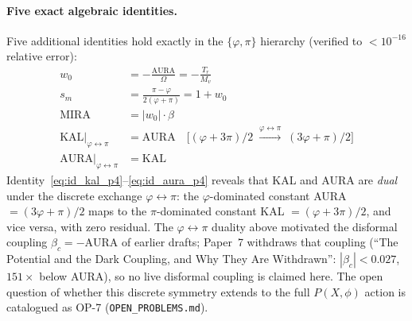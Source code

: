 \documentclass[12pt,a4paper]{article}
\begin{document}
\paragraph{Five exact algebraic identities.}
Five additional identities hold exactly in the $\{\varphi,\pi\}$ hierarchy
(verified to $<10^{-16}$ relative error):
\begin{align}
  w_0 &= -\frac{\mathrm{AURA}}{\Omega}
       = -\frac{T_r}{M_v} \label{eq:id_w0_p4} \\
  s_m &= \frac{\pi-\varphi}{2(\varphi+\pi)}
       = 1 + w_0 \label{eq:id_sm_p4} \\
  \mathrm{MIRA} &= |w_0|\cdot\beta \label{eq:id_mira_p4} \\
  \mathrm{KAL}\big|_{\varphi\leftrightarrow\pi} &= \mathrm{AURA}
       \quad\bigl[(\varphi+3\pi)/2\;\xrightarrow{\varphi\leftrightarrow\pi}\;(3\varphi+\pi)/2\bigr]
       \label{eq:id_kal_p4} \\
  \mathrm{AURA}\big|_{\varphi\leftrightarrow\pi} &= \mathrm{KAL}
       \label{eq:id_aura_p4}
\end{align}
Identity~\eqref{eq:id_kal_p4}--\eqref{eq:id_aura_p4} reveals that KAL and AURA are
\emph{dual} under the discrete exchange $\varphi\leftrightarrow\pi$: the
$\varphi$-dominated constant AURA $=(3\varphi+\pi)/2$ maps to the
$\pi$-dominated constant KAL $=(\varphi+3\pi)/2$, and vice versa, with
zero residual.  The $\varphi\leftrightarrow\pi$ duality above motivated the
disformal coupling $\beta_c=-\mathrm{AURA}$ of earlier drafts; Paper~7
withdraws that coupling (``The Potential and the Dark Coupling, and Why
They Are Withdrawn'': $|\beta_c|<0.027$, $151\times$ below AURA), so no
live disformal coupling is claimed here.
The open question of whether this discrete symmetry extends to the full
$P(X,\phi)$ action is catalogued as OP-7 (\texttt{OPEN\_PROBLEMS.md}).

\clearpage


\end{document}
